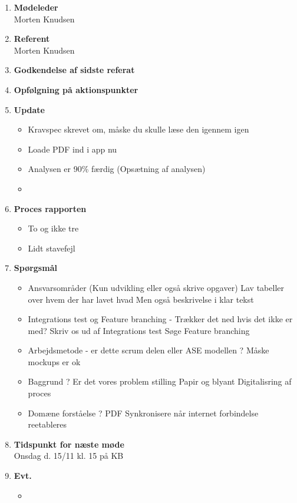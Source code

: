 	\begin{enumerate}
		\itemsep 0.3em 
		\item \textbf{Mødeleder}\\
			Morten Knudsen
		\item \textbf{Referent}\\
			Morten Knudsen
		\item \textbf{Godkendelse af sidste referat}
			
		\item\textbf{Opfølgning på aktionspunkter}

		\item \textbf{Update}
			\begin{itemize}[-]
				\item Kravspec skrevet om, måske du skulle læse den igennem igen
				\item Loade PDF ind i app nu
				\item Analysen er 90\% færdig (Opsætning af analysen)
				\item 
				
			\end{itemize}
	
		\item \textbf{Proces rapporten}
		\begin{itemize}[-]
			\item To og ikke tre
			\item Lidt stavefejl
			
		\end{itemize}
		
		\item \textbf{Spørgsmål}
			\begin{itemize}[-]
				\item Ansvarsområder (Kun udvikling eller også skrive opgaver)
				Lav tabeller over hvem der har lavet hvad
				Men også beskrivelse i klar tekst
				
				\item Integrations test og Feature branching - Trækker det ned hvis det ikke er med?
				Skriv os ud af Integrations test
				Søge Feature branching
				
				\item Arbejdsmetode - er dette scrum delen eller ASE modellen ?
				Måske mockups er ok
				
				\item Baggrund ? Er det vores problem stilling
				Papir og blyant
				Digitalisring af proces
				
				\item Domæne forståelse ?
				PDF
				Synkronisere når internet forbindelse reetableres
				
			\end{itemize}
	
		\item \textbf{Tidspunkt for næste møde} \\
			Onsdag d. 15/11 kl. 15 på KB
			
		\item \textbf{Evt.}
			\begin{itemize}[-]
				\item 
			\end{itemize}
			
	\end{enumerate}
